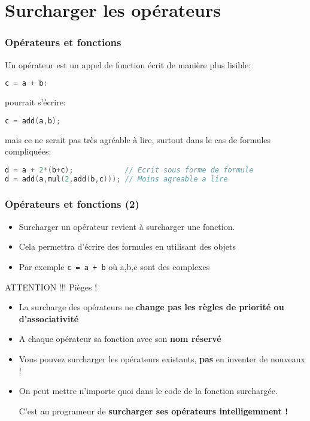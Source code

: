 \documentclass{beamer}
\begin{document}
\section{Surcharger les opérateurs}
\begin{frame}[fragile=singleslide,shrink=20]
\frametitle {Opérateurs et fonctions}
Un opérateur est un appel de fonction écrit de manière plus lisible:

\begin{lstlisting}[language=c++]
c = a + b:
\end{lstlisting}

pourrait s'écrire:

\begin{lstlisting}[language=c++]
c = add(a,b);
\end{lstlisting}
 mais ce ne serait pas très agréable à lire, surtout dans le cas de formules compliquées:
\begin{lstlisting}[language=c++]
d = a + 2*(b+c);            // Ecrit sous forme de formule
d = add(a,mul(2,add(b,c))); // Moins agreable a lire
\end{lstlisting}
\end{frame}

\begin{frame}[fragile=singleslide,shrink=20]
\frametitle {Opérateurs et fonctions (2)}

\begin{itemize}
\item{Surcharger un opérateur revient à surcharger une fonction.}
\item{Cela permettra d'écrire des formules en utilisant des objets}
\item{Par exemple \texttt{c = a + b} où a,b,c sont des complexes}
\end{itemize}

\begin{block}{ATTENTION !!! Pièges !}
\begin{itemize}
\item{La surcharge des opérateurs ne \textbf{change pas les règles de priorité ou d'associativité}}
\item{A chaque opérateur sa fonction avec son \textbf{nom réservé}}
\item{Vous pouvez surcharger les opérateurs existants, \textbf{pas} en inventer de nouveaux !}
\item{On peut mettre n'importe quoi dans le code de la fonction surchargée.

C'est au programeur de \textbf{surcharger ses opérateurs intelligemment !}}
\end{itemize}
\end{block}
\end{frame} 
\end{document}
